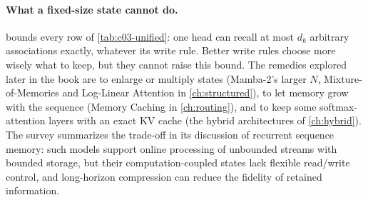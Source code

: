 \paragraph{What a fixed-size state cannot do.}
 bounds every row of \cref{tab:c03-unified}: one head can recall at most
$d_k$ arbitrary associations exactly, whatever its write rule. Better write rules choose more
wisely what to keep, but they cannot raise this bound. The remedies explored later in the book
are to enlarge or multiply states (Mamba-2's larger $N$, Mixture-of-Memories and Log-Linear
Attention in \cref{ch:structured}), to let memory grow with the sequence (Memory Caching in
\cref{ch:routing}), and to keep some softmax-attention layers with an exact KV cache (the hybrid
architectures of \cref{ch:hybrid}). The survey summarizes the trade-off in its discussion of
recurrent sequence memory: such models support online processing of unbounded streams with
bounded storage, but their computation-coupled states lack flexible read/write control, and
long-horizon compression can reduce the fidelity of retained information.

